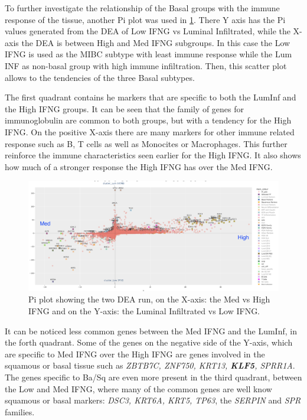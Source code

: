 To further investigate the relationship of the Basal groups with the immune response of the tissue, another Pi plot was used in \cref{fig:cs:pi_basal_inf}. There Y axis has the Pi values generated from the DEA of Low IFNG vs Luminal Infiltrated, while the X-axis the DEA is between High and Med IFNG subgroups. In this case the Low IFNG is used as the MIBC subtype with least immune response while the Lum INF as non-basal group with high immune infiltration. Then, this scatter plot allows to the tendencies of the three Basal subtypes.

The first quadrant contains he markers that are specific to both the LumInf and the High IFNG groups. It can be seen that the family of genes for immunoglobulin are common to both groups, but with a tendency for the High IFNG. On the positive X-axis there are many markers for other immune related response such as B, T cells as well as Monocites or Macrophages. This further reinforce the immune characteristics seen earlier for the High IFNG. It also shows how much of a stronger response the High IFNG has over the Med IFNG.

\begin{figure}[!htb]    
    \centering
    \includegraphics[width=1.0\textwidth,keepaspectratio]{Sections/ClusteringAnalysis/Resources/discussion/basal_infiltrated.png}
    \caption{Pi plot showing the two DEA run, on the X-axis: the Med vs High IFNG and on the Y-axis: the Luminal Infiltrated vs Low IFNG. }
    \label{fig:cs:pi_basal_inf}
\end{figure}


It can be noticed less common genes between the Med IFNG and the LumInf, in the forth quadrant. Some of the genes on the negative side of the Y-axis, which are specific to Med IFNG over the High IFNG are genes involved in the squamous or basal tissue such as \textit{ZBTB7C, ZNF750, KRT13, \textbf{KLF5}, SPRR1A}. The genes specific to Ba/Sq are even more present in the third quadrant, between the Low and Med IFNG, where many of the common genes are well know squamous or basal markers: \textit{DSC3, KRT6A, KRT5, TP63}, the \textit{SERPIN} and \textit{SPR} families.



